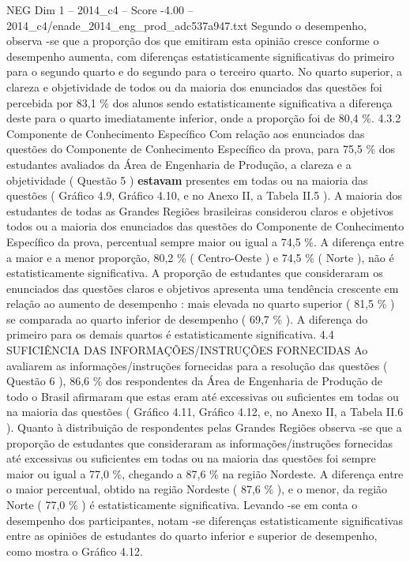 \begin{textsample}{NEG Dim 1 – 2014\_c4 – Score -4.00 – 2014\_c4/enade\_2014\_eng\_prod\_adc537a947.txt}
Segundo o desempenho, observa -se que a proporção dos que emitiram esta opinião cresce conforme o desempenho aumenta, com diferenças estatisticamente significativas do primeiro para o segundo quarto e do segundo para o terceiro quarto.
No quarto superior, a clareza e objetividade de todos ou da maioria dos enunciados das questões foi percebida por 83,1 \% dos alunos sendo estatisticamente significativa a diferença deste para o quarto imediatamente inferior, onde a proporção foi de 80,4 \%. 4.3.2 Componente de Conhecimento Específico Com relação aos enunciados das questões do Componente de Conhecimento Específico da prova, para 75,5 \% dos estudantes avaliados da Área de Engenharia de Produção, a clareza e a objetividade ( Questão 5 ) \textbf{estavam} presentes em todas ou na maioria das questões ( Gráfico 4.9, Gráfico 4.10, e no Anexo II, a Tabela II.5 ).
A maioria dos estudantes de todas as Grandes Regiões brasileiras considerou claros e objetivos todos ou a maioria dos enunciados das questões do Componente de Conhecimento Específico da prova, percentual sempre maior ou igual a 74,5 \%.
A diferença entre a maior e a menor proporção, 80,2 \% ( Centro-Oeste ) e 74,5 \% ( Norte ), não é estatisticamente significativa.
A proporção de estudantes que consideraram os enunciados das questões claros e objetivos apresenta uma tendência crescente em relação ao aumento de desempenho : mais elevada no quarto superior ( 81,5 \% ) se comparada ao quarto inferior de desempenho ( 69,7 \% ).
A diferença do primeiro para os demais quartos é estatisticamente significativa. 4.4 SUFICIÊNCIA DAS INFORMAÇÕES/INSTRUÇÕES FORNECIDAS Ao avaliarem as informações/instruções fornecidas para a resolução das questões ( Questão 6 ), 86,6 \% dos respondentes da Área de Engenharia de Produção de todo o Brasil afirmaram que estas eram até excessivas ou suficientes em todas ou na maioria das questões ( Gráfico 4.11, Gráfico 4.12, e, no Anexo II, a Tabela II.6 ).
Quanto à distribuição de respondentes pelas Grandes Regiões observa -se que a proporção de estudantes que consideraram as informações/instruções fornecidas até excessivas ou suficientes em todas ou na maioria das questões foi sempre maior ou igual a 77,0 \%, chegando a 87,6 \% na região Nordeste.
A diferença entre o maior percentual, obtido na região Nordeste ( 87,6 \% ), e o menor, da região Norte ( 77,0 \% ) é estatisticamente significativa.
Levando -se em conta o desempenho dos participantes, notam -se diferenças estatisticamente significativas entre as opiniões de estudantes do quarto inferior e superior de desempenho, como mostra o Gráfico 4.12.

\end{textsample}

